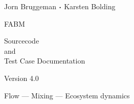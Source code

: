 \documentclass[a4paper,twoside,11pt]{book}
\begin{document}
\begin{titlepage}


{\sf \bf \LARGE
 \begin{center}
   Jorn Bruggeman ${\boldsymbol \cdot}$ Karsten Bolding
 \end{center}
}

\vspace{14mm}

{\sf \bf \Huge
 \begin{center}
   FABM
 \end{center}
}

\vspace{6mm}

{\sf \bf \LARGE
 \begin{center}
   Sourcecode \\
      and \\
Test Case Documentation
 \end{center}
}


\vspace{5mm}

{\sf \bf \Large
 \begin{center}
  Version 4.0
 \end{center}
}

\vspace{8mm}


\vspace{7mm}

{\sf \bf \Large
 \begin{center}
  Flow ---  Mixing --- Ecosystem dynamics
\end{center}
}


\end{titlepage}

\cleardoublepage
\tableofcontents


\cleardoublepage


\cleardoublepage


\cleardoublepage


\cleardoublepage


\cleardoublepage


%
%
\end{document}
